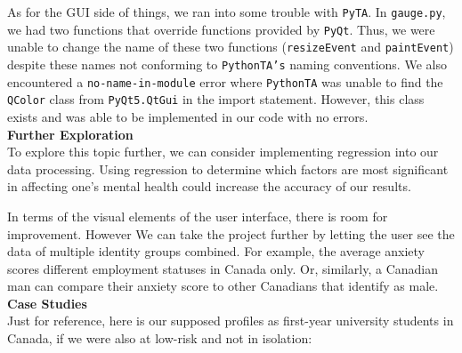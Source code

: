 \documentclass[fontsize=11pt]{article}
\begin{document}
    As for the GUI side of things, we ran into some trouble with \texttt{PyTA}. In \texttt{gauge.py}, we had two functions that override functions provided by \texttt{PyQt}. Thus, we were unable to change the name of these two functions (\texttt{resizeEvent} and \texttt{paintEvent}) despite these names not conforming to \texttt{PythonTA’s} naming conventions. We also encountered a \texttt{no-name-in-module} error where \texttt{PythonTA} was unable to find the \texttt{QColor} class from \texttt{PyQt5.QtGui} in the import statement. However, this class exists and was able to be implemented in our code with no errors. \\

    \textbf{Further Exploration} \\
    To explore this topic further, we can consider implementing regression into our data processing. Using regression to determine which factors are most significant in affecting one’s mental health could increase the accuracy of our results.

    In terms of the visual elements of the user interface, there is room for improvement. However
    We can take the project further by letting the user see the data of multiple identity groups combined. For example, the average anxiety scores different employment statuses in Canada only. Or, similarly, a Canadian man can compare their anxiety score to other Canadians that identify as male. \\

    \textbf{Case Studies} \\
    Just for reference, here is our supposed profiles as first-year university students in Canada, if we were also at low-risk and not in isolation:
\end{document}
